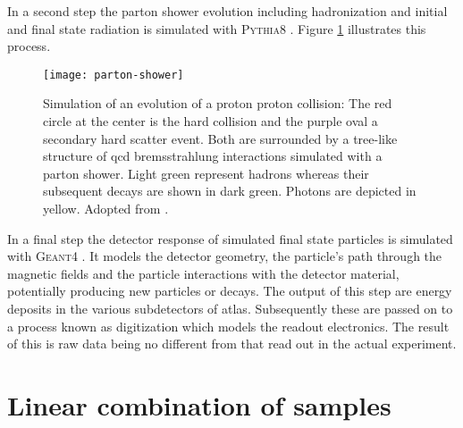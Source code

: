 In a second step the parton shower evolution including hadronization and initial and final state radiation is simulated with \textsc{Pythia8} \citep{Sjostrand:2014zea}. Figure \ref{fig:parton_shower} illustrates this process.
\begin{figure}[]
    \centering
    \texttt{[image: parton-shower]}
    \caption{Simulation of an evolution of a proton proton collision: The red circle at the center is the hard collision and the purple oval a secondary hard scatter event. Both are surrounded by a tree-like structure of \ac{qcd} bremsstrahlung interactions simulated with a parton shower. Light green represent hadrons whereas their subsequent decays are shown in dark green. Photons are depicted in yellow. Adopted from \citep{Hoche:2014rga}.
        \label{fig:parton_shower}}
\end{figure}

In a final step the detector response of simulated final state particles is simulated with \textsc{Geant}4 \citep{Agostinelli:2002hh}. It models the detector geometry, the particle's path through the magnetic fields and the particle interactions with the detector material, potentially producing new particles or decays. The output of this step are energy deposits in the various subdetectors of \ac{atlas}. Subsequently these are passed on to a process known as digitization which models the readout electronics. The result of this is raw data being no different from that read out in the actual experiment.


\section{Linear combination of samples}
\newcommand{\kl}{\kappa_\lambda}
\newcommand{\kt}{\kappa_t}
\newcommand{\kvv}{\kappa_\text{2V}}
\newcommand{\kv}{\kappa_\text{V}}
\newcommand{\mhh}{m_\text{HH}}

